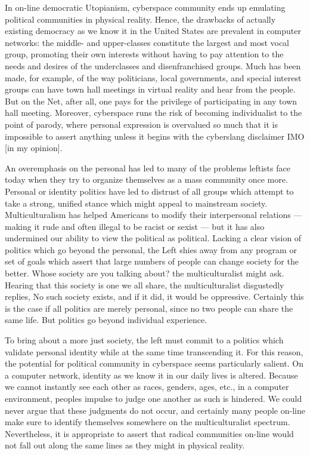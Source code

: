 \documentclass[letterpaper,12pt,english]{sphinxmanual}
\begin{document}
In on-line democratic Utopianism, cyberspace community ends up emulating political communities in physical reality. Hence, the drawbacks of actually existing democracy as we know it in the United States are prevalent in computer networks: the middle- and upper-classes constitute the largest and most vocal group, promoting their own interests without having to pay attention to the needs and desires of the underclasses and disenfranchised groups. Much has been made, for example, of the way politicians, local governments, and special interest groups can have town hall meetings in virtual reality and hear from the people. But on the Net, after all, one pays for the privilege of participating in any town hall meeting. Moreover, cyberspace runs the risk of becoming individualist to the point of parody, where personal expression is overvalued so much that it is impossible to assert anything unless it begins with the cyberslang disclaimer IMO {[}in my opinion{]}.

An overemphasis on the personal has led to many of the problems leftists face today when they try to organize themselves as a mass community once more. Personal or identity politics have led to distrust of all groups which attempt to take a strong, unified stance which might appeal to mainstream society. Multiculturalism has helped Americans to modify their interpersonal relations — making it rude and often illegal to be racist or sexist — but it has also undermined our ability to view the political as political. Lacking a clear vision of politics which go beyond the personal, the Left shies away from any program or set of goals which assert that large numbers of people can change society for the better. Whose society are you talking about? the multiculturalist might ask. Hearing that this society is one we all share, the multiculturalist disgustedly replies, No such society exists, and if it did, it would be oppressive. Certainly this is the case if all politics are merely personal, since no two people can share the same life. But politics go beyond individual experience.

To bring about a more just society, the left must commit to a politics which validate personal identity while at the same time transcending it. For this reason, the potential for political community in cyberspace seems particularly salient. On a computer network, identity as we know it in our daily lives is altered. Because we cannot instantly see each other as races, genders, ages, etc., in a computer environment, peoples impulse to judge one another as such is hindered. We could never argue that these judgments do not occur, and certainly many people on-line make sure to identify themselves somewhere on the multiculturalist spectrum. Nevertheless, it is appropriate to assert that radical communities on-line would not fall out along the same lines as they might in physical reality.
\end{document}
